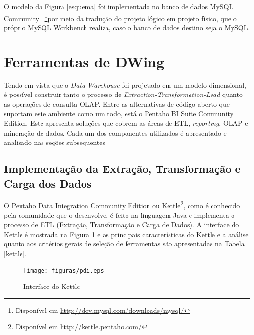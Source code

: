O modelo da Figura \ref{esquema} foi implementado no banco de dados MySQL Community ~\footnote{Disponível em \url{http://dev.mysql.com/downloads/mysql/}}por meio da tradução do projeto lógico em projeto físico, que o próprio MySQL Workbench realiza, caso o banco de dados destino seja o MySQL.

\section{Ferramentas de DWing}

Tendo em vista que o \textit{Data Warehouse} foi projetado em um modelo dimensional, é possível construir tanto o processo de \textit{Extraction-Transformation-Load} quanto as operações de consulta OLAP. Entre as alternativas de código aberto que suportam este ambiente como um todo, está o Pentaho BI Suite Community Edition. Este apresenta soluções que cobrem 
as áreas de ETL, \textit{reporting}, OLAP e mineração de dados. Cada um dos componentes utilizados é apresentado e analisado nas seções subsequentes.
 


\subsection{Implementação da Extração, Transformação e Carga dos Dados}
\label{implementação-ETL}
O Pentaho Data Integration Community Edition ou Kettle\footnote{Disponível em \url{http://kettle.pentaho.com/}}, como é conhecido pela comunidade que o desenvolve, é feito na linguagem Java e implementa o processo de ETL (Extração, Transformação e Carga de Dados). A interface do Kettle é mostrada na Figura \ref{pdi} e as principais características do Kettle e a análise quanto aos critérios gerais de seleção de ferramentas são apresentadas na Tabela \ref{kettle}.

\begin{figure}[ht!]
\centering
\texttt{[image: figuras/pdi.eps]}
\caption{Interface do Kettle}
\label{pdi}
\end{figure}
\FloatBarrier
 

